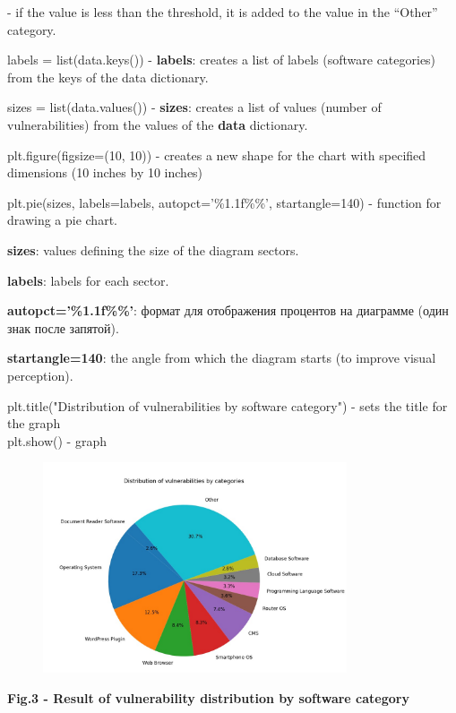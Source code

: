 - if the value is less than the threshold, it is added to the value in
the ``Other'' category.

labels = list(data.keys()) - {\bfseries labels}: creates a list of labels
(software categories) from the keys of the data dictionary.

sizes = list(data.values()) - {\bfseries sizes}: creates a list of values
(number of vulnerabilities) from the values of the {\bfseries data}
dictionary.

plt.figure(figsize=(10, 10)) - creates a new shape for the chart with
specified dimensions (10 inches by 10 inches)

plt.pie(sizes, labels=labels,
autopct='\%1.1f\%\%', startangle=140) -
function for drawing a pie chart.

{\bfseries sizes}: values defining the size of the diagram sectors.

{\bfseries labels}: labels for each sector.

{\bfseries autopct='\%1.1f\%\%'{}}: формат
для отображения процентов на диаграмме (один знак после запятой).

{\bfseries startangle=140}: the angle from which the diagram starts (to
improve visual perception).

plt.title("Distribution of vulnerabilities by software category") - sets
the title for the graph\\
plt.show() - graph


\begin{figure}[H]
	\centering
	\includegraphics[width=0.8\textwidth]{media/ict2/image166}
	\caption*{}
\end{figure}


{\bfseries Fig.3 - Result of vulnerability distribution by software
category}

\def\labelenumi{\arabic{enumi})}
\setcounter{enumi}{2}

